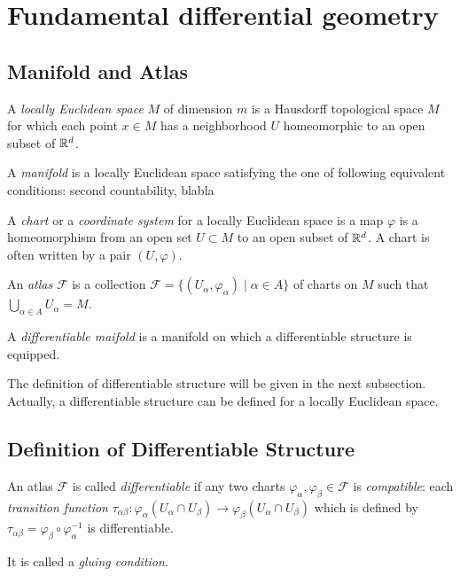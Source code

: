 \documentclass[11pt]{article}
\let\realsection\section
\renewcommand\section{\newpage\realsection}
\begin{document}
\section{Fundamental differential geometry}

\subsection{Manifold and Atlas}
\begin{defn}
A \emph{locally Euclidean space} $M$ of dimension $m$ is a Hausdorff topological space $M$ for which each point $x\in M$ has a neighborhood $U$ homeomorphic to an open subset of $\mathbb{R}^d$.
\end{defn}
\begin{defn}
A \emph{manifold} is a locally Euclidean space satisfying the one of following equivalent conditions: second countability, blabla%
\end{defn}

\begin{defn}
A \emph{chart} or a \emph{coordinate system} for a locally Euclidean space is a map $\varphi$ is a homeomorphism from an open set $U\subset M$ to an open subset of $\mathbb{R}^d$.
A chart is often written by a pair $(U,\varphi)$.
\end{defn}

\begin{defn}
An \emph{atlas} $\mathcal{F}$ is a collection $\mathcal{F}=\{(U_\alpha,\varphi_\alpha)\mid\alpha\in A\}$ of charts on $M$ such that $\bigcup_{\alpha\in A} U_\alpha=M$.
\end{defn}


\begin{defn}
A \emph{differentiable maifold} is a manifold on which a differentiable structure is equipped.
\end{defn}
The definition of differentiable structure will be given in the next subsection.
Actually, a differentiable structure can be defined for a locally Euclidean space.



\subsection{Definition of Differentiable Structure}


\begin{defn}
An atlas $\mathcal{F}$ is called \emph{differentiable} if any two charts $\varphi_\alpha,\varphi_\beta\in\mathcal{F}$ is \emph{compatible}: each \emph{transition function} $\tau_{\alpha\beta}\colon\varphi_\alpha(U_\alpha\cap U_\beta)\to\varphi_\beta(U_\alpha\cap U_\beta)$ which is defined by $\tau_{\alpha\beta}=\varphi_\beta\circ\varphi_\alpha^{-1}$ is differentiable.
\end{defn}
It is called a \emph{gluing condition}.
\end{document}
